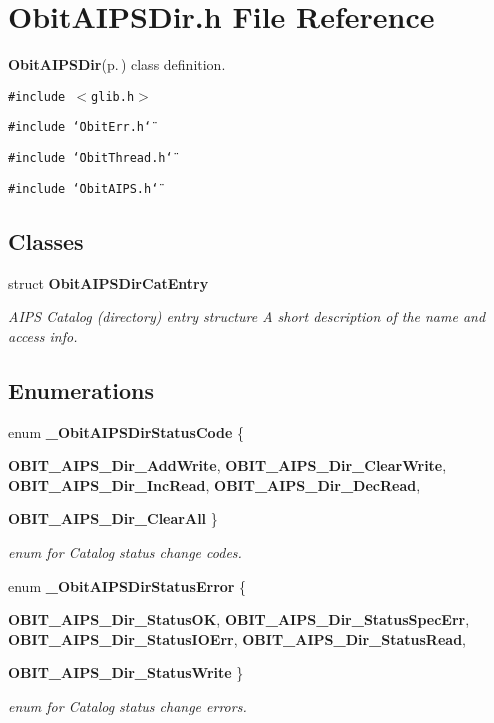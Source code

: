 \section{Obit\-AIPSDir.h File Reference}
\label{ObitAIPSDir_8h}
{\bf Obit\-AIPSDir}{\rm (p.\,\pageref{structObitAIPSDir})} class definition. 

{\tt \#include $<$glib.h$>$}\par
{\tt \#include \char`\"{}Obit\-Err.h\char`\"{}}\par
{\tt \#include \char`\"{}Obit\-Thread.h\char`\"{}}\par
{\tt \#include \char`\"{}Obit\-AIPS.h\char`\"{}}\par
\subsection*{Classes}
\begin{CompactItemize}
\item 
struct {\bf Obit\-AIPSDir\-Cat\-Entry}
\begin{CompactList}\small\item\em AIPS Catalog (directory) entry structure A short description of the name and access info. \item\end{CompactList}\end{CompactItemize}
\subsection*{Enumerations}
\begin{CompactItemize}
\item 
enum {\bf \_\-Obit\-AIPSDir\-Status\-Code} \{ \par
{\bf OBIT\_\-AIPS\_\-Dir\_\-Add\-Write}, 
{\bf OBIT\_\-AIPS\_\-Dir\_\-Clear\-Write}, 
{\bf OBIT\_\-AIPS\_\-Dir\_\-Inc\-Read}, 
{\bf OBIT\_\-AIPS\_\-Dir\_\-Dec\-Read}, 
\par
{\bf OBIT\_\-AIPS\_\-Dir\_\-Clear\-All}
 \}
\begin{CompactList}\small\item\em enum for Catalog status change codes. \item\end{CompactList}\item 
enum {\bf \_\-Obit\-AIPSDir\-Status\-Error} \{ \par
{\bf OBIT\_\-AIPS\_\-Dir\_\-Status\-OK}, 
{\bf OBIT\_\-AIPS\_\-Dir\_\-Status\-Spec\-Err}, 
{\bf OBIT\_\-AIPS\_\-Dir\_\-Status\-IOErr}, 
{\bf OBIT\_\-AIPS\_\-Dir\_\-Status\-Read}, 
\par
{\bf OBIT\_\-AIPS\_\-Dir\_\-Status\-Write}
 \}
\begin{CompactList}\small\item\em enum for Catalog status change errors. \item\end{CompactList}\end{CompactItemize}
